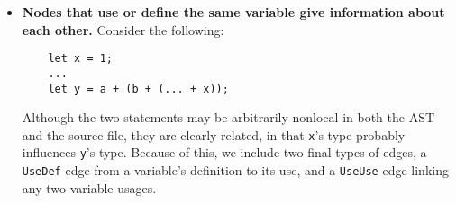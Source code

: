 \begin{itemize}
\item \textbf{Nodes that use or define the same variable give information about each other.}
  Consider the following:
  \begin{lstlisting}
    let x = 1;
    ...
    let y = a + (b + (... + x));
  \end{lstlisting}
  Although the two statements may be arbitrarily nonlocal in both the AST and the source file, they are clearly related, in that \texttt{x}'s type probably influences \texttt{y}'s type.
  Because of this, we include two final types of edges, a \texttt{UseDef} edge from a variable's definition to its use, and a \texttt{UseUse} edge linking any two variable usages.
\end{itemize}

